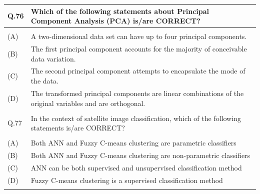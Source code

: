 \documentclass[12pt]{article}
\begin{document}
 \begin{table}[H]
\renewcommand{\arraystretch}{3}
\setlength{\tabcolsep}{8pt}
\begin{tabular}{|l|p{15cm}|}
\hline
 
Q.76&Which of the following statements about Principal Component Analysis (PCA)
is/are CORRECT?\\ \hline 
&  \\ \hline
(A)&A two-dimensional data set can have up to four principal components.\\ \hline
(B)&The first principal component accounts for the majority of conceivable data
variation.\\ \hline
(C)&The second principal component attempts to encapsulate the mode of the data.\\ \hline
(D)&The transformed principal components are linear combinations of the original
variables and are orthogonal.\\ \hline
 & \\ \hline

Q.77 &In the context of satellite image classification, which of the following statements
is/are CORRECT?\\ \hline
 & \\ \hline
(A)&Both ANN and Fuzzy C-means clustering are parametric classifiers\\ \hline
(B)&Both ANN and Fuzzy C-means clustering are non-parametric classifiers\\ \hline
(C)&ANN can be both supervised and unsupervised classification method\\ \hline
(D)&Fuzzy C-means clustering is a supervised classification method\\ \hline

& \\ \hline

\end{tabular}
\end{table}
\end{document}
